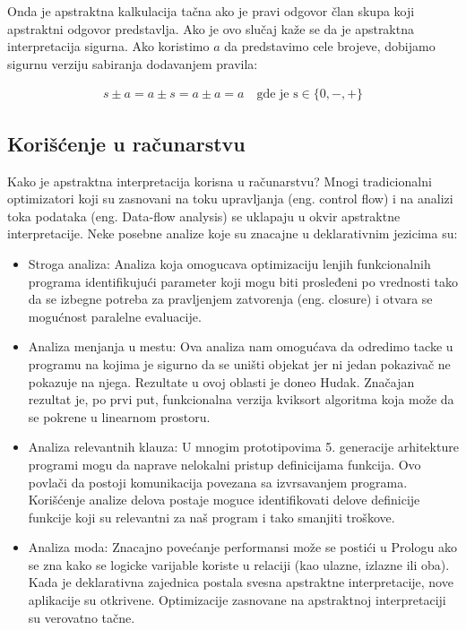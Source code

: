 Onda je apstraktna kalkulacija tačna ako je pravi odgovor član skupa koji apstraktni odgovor predstavlja. Ako je ovo slučaj kaže se da je apstraktna interpretacija sigurna. Ako koristimo $a$ da predstavimo cele brojeve, dobijamo sigurnu verziju sabiranja dodavanjem pravila:

\begin{multline}	
	s \pm a = a \pm s = a \pm a = a \quad \text{gde je s} \in \{0, -, +\}
\end{multline}


\subsection{Korišćenje u računarstvu}
\label{subsec:problem1}
Kako je apstraktna interpretacija korisna u računarstvu? Mnogi tradicionalni optimizatori koji su zasnovani na toku upravljanja (eng. control flow) i na analizi toka podataka (eng. Data-flow analysis) se uklapaju u okvir apstraktne interpretacije. Neke posebne analize koje su znacajne u deklarativnim jezicima su:

\begin{itemize}
\item Stroga analiza:
Analiza koja omogucava optimizaciju lenjih  funkcionalnih programa identifikujući parameter koji mogu biti prosleđeni po vrednosti tako da se izbegne potreba za pravljenjem zatvorenja (eng. closure) i otvara se mogućnost paralelne evaluacije. 

\item Analiza menjanja u mestu:
Ova analiza nam omogućava da odredimo tacke u programu na kojima je sigurno da se uništi objekat jer ni jedan pokazivač ne pokazuje na njega. Rezultate u ovoj oblasti je doneo Hudak. Značajan rezultat je, po prvi put, funkcionalna verzija kviksort algoritma koja može da se pokrene u linearnom prostoru. \cite{Girard1987}

\item Analiza relevantnih klauza:
U mnogim prototipovima 5. generacije arhitekture programi mogu da naprave nelokalni pristup definicijama funkcija. Ovo povlači da postoji komunikacija povezana sa izvrsavanjem programa. Korišćenje analize delova postaje moguce identifikovati delove definicije funkcije koji su relevantni za naš program i tako smanjiti troškove.  

\item Analiza moda:
Znacajno povećanje performansi može se postići u Prologu ako se zna kako se logicke varijable koriste u relaciji (kao ulazne, izlazne ili oba).
Kada je deklarativna zajednica postala svesna apstraktne interpretacije, nove aplikacije su otkrivene. Optimizacije zasnovane na apstraktnoj interpretaciji su verovatno tačne. 

\end{itemize}

